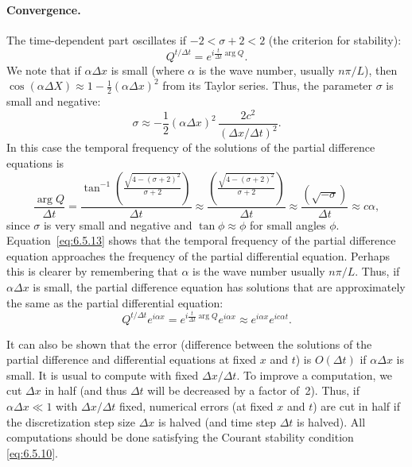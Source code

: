 \paragraph{Convergence.}
The time-dependent part oscillates if $-2 < \sigma + 2 < 2$ (the criterion for stability):
\begin{equation}
Q^{t/\Delta t} = e^{i\frac{t}{\Delta t}\arg Q}.
\label{eq:6.5.12}
\end{equation}
We note that if $\alpha\Delta x$ is small (where $\alpha$ is the wave number, usually $n\pi/L$), then $\cos(\alpha\Delta X) \approx 1 - \frac{1}{2}(\alpha\Delta x)^2$ from its Taylor series.  Thus, the parameter $\sigma$ is small and negative:
\[
\sigma \approx -\frac{1}{2}(\alpha\Delta x)^2\,\frac{2c^2}{(\Delta x/\Delta t)^2}.
\]
In this case the temporal frequency of the solutions of the partial difference equations is
\begin{equation}
\frac{\arg Q}{\Delta t} = \frac{\tan^{-1}\!\left(\frac{\sqrt{4 - (\sigma+2)^2}}{\sigma + 2}\right)}{\Delta t} \approx \frac{\left(\frac{\sqrt{4 - (\sigma+2)^2}}{\sigma + 2}\right)}{\Delta t} \approx \frac{(\sqrt{-\sigma})}{\Delta t} \approx c\alpha,
\label{eq:6.5.13}
\end{equation}
since $\sigma$ is very small and negative and $\tan\phi \approx \phi$ for small angles $\phi$.  Equation~\eqref{eq:6.5.13} shows that the temporal frequency of the partial difference equation approaches the frequency of the partial differential equation.  Perhaps this is clearer by remembering that $\alpha$ is the wave number usually $n\pi/L$.  Thus, if $\alpha\Delta x$ is small, the partial difference equation has solutions that are approximately the same as the partial differential equation:
\[
Q^{t/\Delta t}e^{i\alpha x} = e^{i\frac{t}{\Delta t}\arg Q}e^{i\alpha x} \approx e^{i\alpha x}e^{ic\alpha t}.
\]

It can also be shown that the error (difference between the solutions of the partial difference and differential equations at fixed $x$ and $t$) is $O(\Delta t)$ if $\alpha\Delta x$ is small.  It is usual to compute with fixed $\Delta x/\Delta t$.  To improve a computation, we cut $\Delta x$ in half (and thus $\Delta t$ will be decreased by a factor of~2).  Thus, if $\alpha\Delta x \ll 1$ with $\Delta x/\Delta t$ fixed, numerical errors (at fixed $x$ and $t$) are cut in half if the discretization step size $\Delta x$ is halved (and time step $\Delta t$ is halved).  All computations should be done satisfying the Courant stability condition \eqref{eq:6.5.10}.

